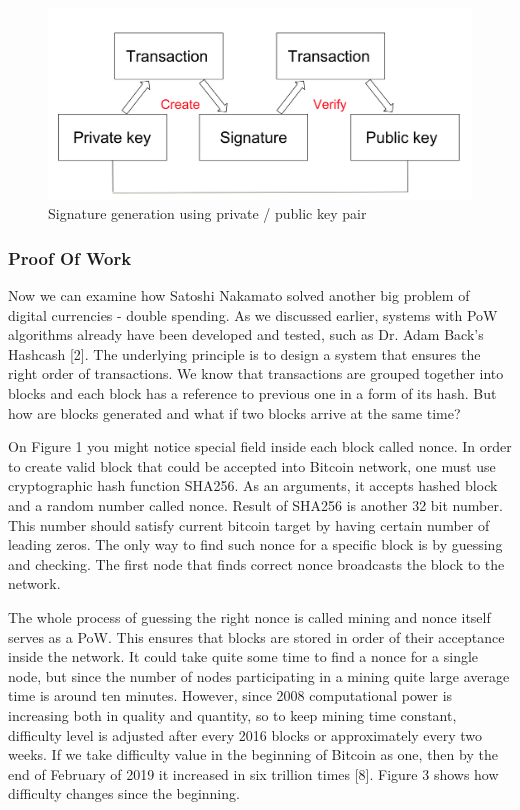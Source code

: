 \documentclass[conference,compsoc]{IEEEtran}
\begin{document}
\begin{figure}[h]
  \centering
  \includegraphics[width=.45\textwidth]{graphics/private_public.png}
  \caption{Signature generation using private / public key pair}
  \label{fig:fig2}
\end{figure}

\subsubsection{Proof Of Work}
Now we can examine how Satoshi Nakamato solved another big problem of digital currencies - double spending.
As we discussed earlier, systems with PoW algorithms already have been developed and tested, such as Dr. Adam Back's Hashcash [2]. 
The underlying principle is to design a system that ensures the right order of transactions. 
We know that transactions are grouped together into blocks and each block has a reference to previous one in a form of its hash. 
But how are blocks generated and what if two blocks arrive at the same time? 

On Figure 1 you might notice special field inside each block called nonce. 
In order to create valid block that could be accepted into Bitcoin network, one must use cryptographic hash function SHA256. 
As an arguments, it accepts hashed block and a random number called nonce.
Result of SHA256 is another 32 bit number. 
This number should satisfy current bitcoin target by having certain number of leading zeros. 
The only way to find such nonce for a specific block is by guessing and checking. 
The first node that finds correct nonce broadcasts the block to the network. 

The whole process of guessing the right nonce is called mining and nonce itself serves as a PoW. 
This ensures that blocks are stored in order of their acceptance inside the network.
It could take quite some time to find a nonce for a single node, but since the number of nodes participating in a mining quite large average time is around ten minutes. 
However, since 2008 computational power is increasing both in quality and quantity, so to keep mining time constant, difficulty level is adjusted after every 2016 blocks or approximately every two weeks. 
If we take difficulty value in the beginning of Bitcoin as one, then by the end of February of 2019 it increased in six trillion times [8].
Figure 3 shows how difficulty changes since the beginning.
\end{document}
